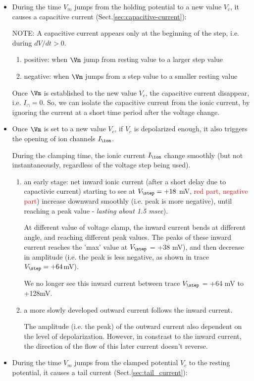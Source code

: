 \begin{itemize}
  \item During the time  $V_m$ jumps from the holding potential to a new value
  $V_c$, it causes a capacitive current (Sect.\ref{sec:capacitive-current}):

  NOTE: A capacitive current appears only at
  the beginning of the step, i.e. during $dV/dt>0$.
  \begin{enumerate}
    \item positive: when $\Vm$ jump from resting value to a larger step value
    \item negative: when $\Vm$ jumps from a step value to a smaller resting
    value
  \end{enumerate}

Once $\Vm$ is established to the new value $V_c$, the capacitive current
disappear, i.e. $I_\cap = 0$. So, we can isolate the capacitive current from the
ionic current, by ignoring the current at a short time period after the voltage
change.

  \item Once $\Vm$ is set to a new value $V_c$, if $V_c$ is depolarized
  enough, it also triggers the opening of ion channels $I_\ion$.

  During the clamping time, the ionic current $I_\ion$ change smoothly (but not
  instantaneously, regardless of the voltage step being used).

  \begin{enumerate}

    \item an early stage: net inward ionic current (after a short delay due to
    capactivie current) starting to see at $V_\step=+18$ mV, \textcolor{red}{red part,
    negative part}) increase downward smoothly (i.e. peak is more negative),
    until reaching a peak value - {\it lasting about 1.5 msec}).

    At different value of voltage clamp, the inward current bends at different
    angle, and reaching different peak values.
    The peaks of these  inward current reaches the 'max' value at $V_\step$ =
    +38 mV), and then decrease in amplitude (i.e. the peak is less negative, as
    shown in trace $V_\step=+64$mV).

    We no longer see this inward current between trace $V_\step$ = +64 mV to
    +128mV.

    \item a more slowly developed outward current follows the inward current.

    The amplitude (i.e. the peak) of the outward current also dependent on the
    level of depolarization. However, in constrast to the inward current, the
    direction of the flow of this later current doesn't reverse.

  \end{enumerate}

  \item During the time  $V_m$ jumps from the clamped potential
  $V_c$ to the resting potential, it causes a tail current
  (Sect.\ref{sec:tail_current}):
\end{itemize}


